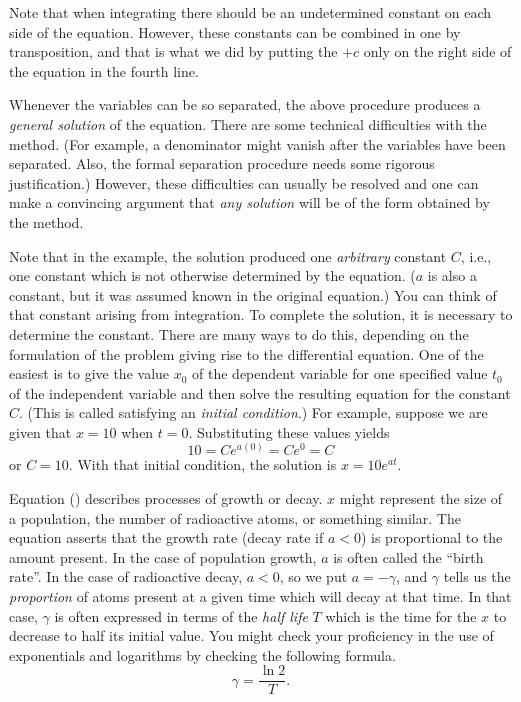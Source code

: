 Note that when integrating  there should be an
undetermined constant on each side of the equation.  However, these
constants can be combined in one by transposition, and that is what
we did by putting the $+ c$ only on the right side of the equation
in the fourth line.

Whenever the variables can be so separated, the above procedure
produces a {\it general solution\/} of the equation.
There are some technical difficulties with the method.
(For example, a denominator might vanish after the variables
have been separated.
 Also, the
formal separation procedure needs some rigorous justification.)
However, these difficulties can usually be resolved and one can
make a convincing argument
that {\it any solution\/} will be of the form obtained
by the method.

Note that in the example, the solution produced one {\it arbitrary\/}
constant  $C$, i.e., one constant which is not otherwise determined
by the equation.  ($a$ is also a constant, but it was assumed known
in the original equation.)   You can think of that constant arising
from integration.   To complete the solution, it is necessary to
determine the constant.  There are many ways to do this, depending
on the formulation of the problem giving rise to the
differential equation.  One of the easiest is to
give the value $x_0$ of the dependent variable  for one specified value
$t_0$ of the independent variable and then solve the resulting equation
for the constant $C$.  (This is called satisfying an
{\it initial condition}.)  For example, suppose we are given that
%
$x = 10$ when $t = 0$.  Substituting these values yields
$$
    10 = Ce^{a(0)} = Ce^0 = C
$$
or $C = 10$.  With that initial condition, the solution is
$x = 10e^{at}$.   

Equation (\FirstEx) describes processes of growth or decay.  $x$
might represent the size of a population, the number of radioactive
atoms, or something similar.   The equation asserts that the
growth rate (decay rate if $a < 0$) is proportional to the amount
present.  In the case of population growth, $a$ is often called the
``birth rate''.  In the case of radioactive decay, $a <0$, so
we put $a = -\gamma$,
and $\gamma$ tells us the
 {\it proportion\/} of atoms present at a given
time which will decay at that time.   In that case,  $\gamma$ is often expressed in
terms of the {\it half life\/} $T$ which is the time for the
$x$ to decrease to half its initial value.  You might check
your proficiency in the use of exponentials and logarithms by
checking the following formula.
$$
     \gamma = \frac{\ln 2}T.
$$

